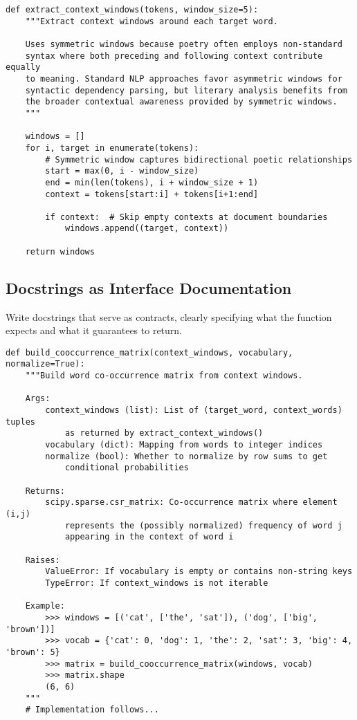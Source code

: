 \documentclass[11pt,a4paper]{article}
\begin{document}
\begin{lstlisting}[caption=Comments that explain intent and reasoning]
def extract_context_windows(tokens, window_size=5):
    """Extract context windows around each target word.
    
    Uses symmetric windows because poetry often employs non-standard
    syntax where both preceding and following context contribute equally
    to meaning. Standard NLP approaches favor asymmetric windows for
    syntactic dependency parsing, but literary analysis benefits from
    the broader contextual awareness provided by symmetric windows.
    """
    
    windows = []
    for i, target in enumerate(tokens):
        # Symmetric window captures bidirectional poetic relationships
        start = max(0, i - window_size)
        end = min(len(tokens), i + window_size + 1)
        context = tokens[start:i] + tokens[i+1:end]
        
        if context:  # Skip empty contexts at document boundaries
            windows.append((target, context))
    
    return windows
\end{lstlisting}

\subsection{Docstrings as Interface Documentation}

Write docstrings that serve as contracts, clearly specifying what the function expects and what it guarantees to return.

\begin{lstlisting}[caption=Comprehensive docstring documentation]
def build_cooccurrence_matrix(context_windows, vocabulary, normalize=True):
    """Build word co-occurrence matrix from context windows.
    
    Args:
        context_windows (list): List of (target_word, context_words) tuples
            as returned by extract_context_windows()
        vocabulary (dict): Mapping from words to integer indices
        normalize (bool): Whether to normalize by row sums to get
            conditional probabilities
    
    Returns:
        scipy.sparse.csr_matrix: Co-occurrence matrix where element (i,j)
            represents the (possibly normalized) frequency of word j
            appearing in the context of word i
    
    Raises:
        ValueError: If vocabulary is empty or contains non-string keys
        TypeError: If context_windows is not iterable
    
    Example:
        >>> windows = [('cat', ['the', 'sat']), ('dog', ['big', 'brown'])]
        >>> vocab = {'cat': 0, 'dog': 1, 'the': 2, 'sat': 3, 'big': 4, 'brown': 5}
        >>> matrix = build_cooccurrence_matrix(windows, vocab)
        >>> matrix.shape
        (6, 6)
    """
    # Implementation follows...
\end{lstlisting}
\end{document}
